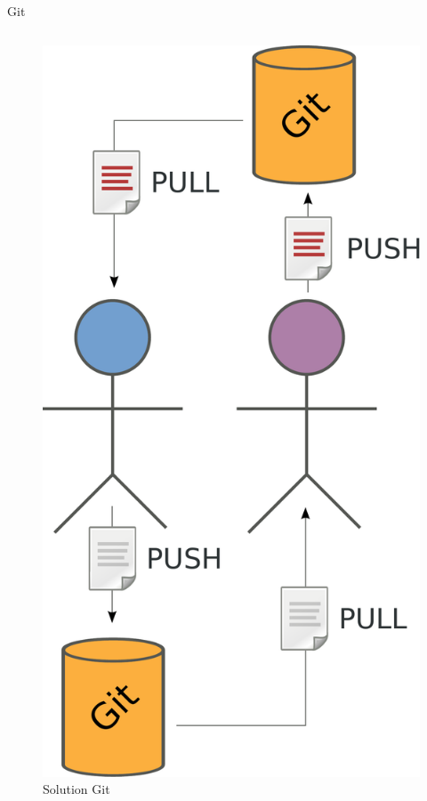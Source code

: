 \begin{frame}{Git}
\begin{columns}
  \begin{column}{.4\textwidth}
  \begin{figure}
    \center
    \includegraphics[height=.7\textheight]{includes/git.pdf}
    \caption{Solution Git}
  \end{figure}
  \end{column}
\end{columns}
\end{frame}

